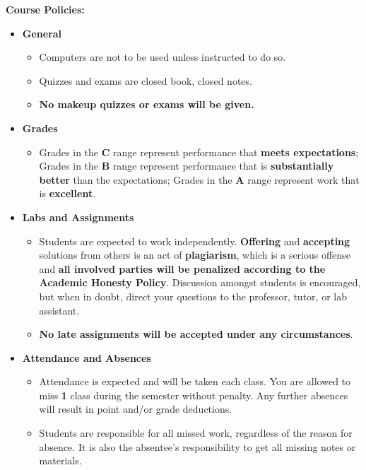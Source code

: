\documentclass[11pt]{article}
\begin{document}
\textbf {Course Policies:}
\begin{itemize}
	\item \textbf {General}
		\begin{itemize}
			\item Computers are not to be used unless instructed to do so.
			\item Quizzes and exams are closed book, closed notes.
			\item \textbf {No makeup quizzes or exams will be given.}
		\end{itemize}
	\item \textbf {Grades}
		\begin{itemize}
			\item Grades in the \textbf{C} range represent performance that \textbf{meets expectations}; Grades in the \textbf{B} range represent performance that is \textbf{substantially better} than the expectations; Grades in the \textbf{A} range represent work that is \textbf{excellent}.
		\end{itemize}
	\item \textbf {Labs and Assignments}
		\begin{itemize}
			\item Students are expected to work independently. \textbf{Offering} and \textbf{accepting} solutions from others is an act of \textbf{plagiarism}, which is a serious offense and \textbf{all involved parties will be penalized according to the Academic Honesty Policy}. Discussion amongst students is encouraged, but when in doubt, direct your questions to the professor, tutor, or lab assistant.
			\item \textbf{No late assignments will be accepted under any circumstances}.
		\end{itemize}
	\item \textbf{Attendance and Absences}
		\begin{itemize}
			\item Attendance is expected and will be taken each class. You are allowed to miss \textbf{1} class during the semester without penalty. Any further absences will result in point and/or grade deductions.
			\item Students are responsible for all missed work, regardless of the reason for absence. It is also the absentee's responsibility to get all missing notes or materials. 
		\end{itemize}
\end{itemize}
\end{document}
